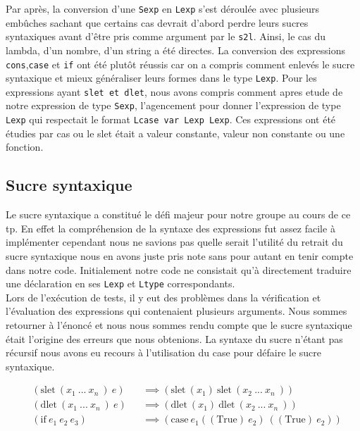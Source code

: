 \documentclass[10pt, titlepage]{article}
\begin{document}
Par après, la conversion d'une \texttt{Sexp} en \texttt{Lexp} s'est déroulée
avec plusieurs embûches sachant que certains cas devrait d'abord perdre leurs sucres syntaxiques avant d'être pris comme argument par le \texttt{s2l}. Ainsi, le cas du lambda, d'un nombre, d'un string a été directes. La conversion des expressions \texttt{cons},\texttt{case} et \texttt{if} ont été plutôt réussis car on a compris comment enlevés le sucre syntaxique et mieux généraliser leurs formes dans le type \texttt{Lexp}. 
Pour les expressions ayant \texttt{slet et dlet}, nous avons compris comment apres etude de notre expression de type \texttt{Sexp}, l'agencement pour donner l'expression de type \texttt{Lexp} qui respectait le format \texttt{Lcase var Lexp Lexp}. Ces expressions ont été étudies par cas ou le slet était a valeur constante, valeur non constante ou une fonction.\\

\subsection{Sucre syntaxique}
Le sucre syntaxique a constitué le défi majeur pour notre groupe au cours de ce tp. 
En effet la compréhension  de la syntaxe des expressions fut assez facile à implémenter cependant nous ne savions pas quelle serait l'utilité du retrait du sucre syntaxique nous en avons juste pris note sans pour autant en tenir compte dans notre code. Initialement notre code ne consistait qu'à directement traduire  une déclaration en ses \texttt{Lexp} et \texttt{Ltype} correspondants.\\
Lors de l'exécution de tests, il y eut des problèmes dans la vérification et
l'évaluation des expressions qui contenaient plusieurs arguments. Nous sommes retourner à l'énoncé et nous nous sommes rendu compte que le sucre syntaxique était l'origine des erreurs que nous obtenions. La syntaxe du sucre n'étant pas récursif nous avons eu recours à l'utilisation du case pour défaire le sucre syntaxique.

\begin{equation*}
   \begin{aligned}
            & (\text{slet} \ (x_1 \  ... \ x_n \ ) \  e) && \implies (\text{slet} \ (x_1) \ \text{slet} \ (x_2 \  ... \ x_n \ ) )\\
            & (\text{dlet} \ (x_1 \  ... \ x_n \ ) \  e) && \implies (\text{dlet} \ (x_1) \ \text{dlet} \ (x_2 \  ... \ x_n \ ) )\\
        & (\text{if} \ e_1 \ e_2 \ e_3) && \implies (\text{case} \ e_1 ((\text{True}) \ e_2) \ ((\text{True}) \ e_2) )
    \end{aligned}
\end{equation*}
\end{document}
